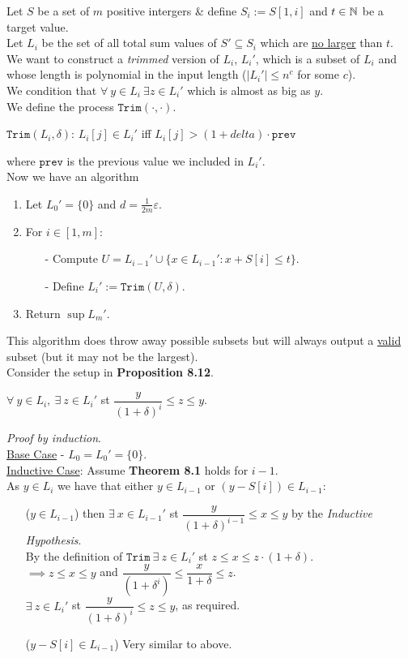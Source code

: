 \documentclass[11pt,a4paper]{article}
\begin{document}
Let $S$ be a set of $m$ positive intergers \& define $S_i:=S[1,i]$ and $t\in\mathbb{N}$ be a target value.\\
Let $L_i$ be the set of all total sum values of $S'\subseteq S_i$ which are \underline{no larger} than $t$.\\
We want to construct a \textit{trimmed} version of $L_i$, $L_i'$, which is a subset of $L_i$ and whose length is polynomial in the input length (\ie $|L_i'|\leq n^c$ for some $c$).\\
We condition that $\forall\ y\in L_i\ \exists z\in L_i'$ which is almost as big as $y$.\\
We define the process $\mathtt{Trim}(\cdot,\cdot)$.
\begin{center}
$\mathtt{Trim}(L_i,\delta)$: $L_i[j]\in L_i'$ iff $L_i[j]>(1+delta)\cdot\mathtt{prev}$
\end{center}
where $\mathtt{prev}$ is the previous value we included in $L_i'$.\\
Now we have an algorithm
\begin{enumerate}
	\item Let $L_0'=\{0\}$ and $d=\frac1{2m}\varepsilon$.
	\item For $i\in[1,m]$:
	\begin{itemize}
		\item[-] Compute $U=L_{i-1}'\cup\{x\in L_{i-1}':x+S[i]\leq t\}$.
		\item[-] Define $L_i':=\mathtt{Trim}(U,\delta)$.
	\end{itemize}
	\item Return $\sup L_m'$.
\end{enumerate}
This algorithm does throw away possible subsets but will always output a \underline{valid} subset (but it may not be the largest).\\

\theorem{}
Consider the setup in \textbf{Proposition 8.12}.
\begin{center}
$\forall\ y\in L_i,\ \exists\ z\in L_i'$ st $\dfrac{y}{(1+\delta)^i}\leq z\leq y$.
\end{center}

\textit{Proof by induction}.\\
\underline{Base Case} - $L_0=L_0'=\{0\}$.\\
\underline{Inductive Case}: Assume \textbf{Theorem 8.1} holds for $i-1$.\\
As $y\in L_i$ we have that either $y\in L_{i-1}$ or $(y-S[i])\in L_{i-1}$:
\begin{itemize}
	\item[($y\in L_{i-1}$)] then $\exists\ x\in L_{i-1}'$ st $\dfrac{y}{(1+\delta)^{i-1}}\leq x\leq y$ by the \textit{Inductive Hypothesis}.\\
	By the definition of $\mathtt{Trim}\ \exists\ z\in L_i'$ st $z\leq x\leq z\cdot(1+\delta)$.\\
	$\implies z\leq x\leq y$ and $\dfrac{y}{(1+\delta^i)}\leq\dfrac{x}{1+\delta}\leq z$.\\
	\ie $\exists\ z\in L_i'$ st $\dfrac{y}{(1+\delta)^i}\leq z\leq y$, as required.
	\item[($y-S{[i]}\in L_{i-1}$)] Very similar to above.
\end{itemize}
\end{document}
